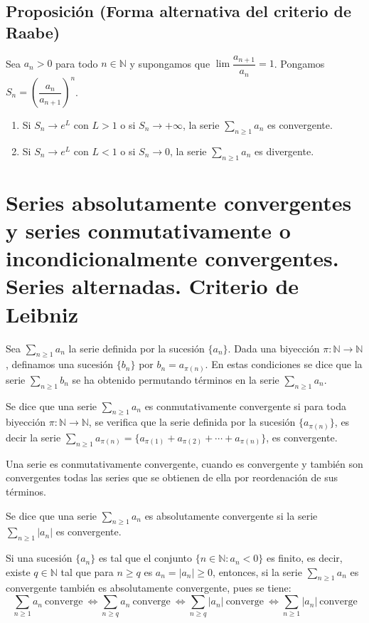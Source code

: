\documentclass[10pt,a4paper]{article}
\begin{document}
	\subsection{Proposición (Forma alternativa del criterio de Raabe)}
	
	Sea $a_n > 0$ para todo $n \in \mathbb{N}$ y supongamos que $\lim\dfrac{a_{n+1}}{a_n} = 1$. Pongamos $S_n = \left(\dfrac{a_n}{a_{n+1}}\right)^n$.
	\begin{enumerate}[label = \roman*)]
		\item Si $S_n \rightarrow e^L$ con $L > 1$ o si $S_n \rightarrow + \infty$, la serie $\displaystyle \sum_{n \geq 1}a_n$ es convergente.
		\item Si $S_n \rightarrow e^L$ con $L < 1$ o si $S_n \rightarrow 0$, la serie $\displaystyle \sum_{n \geq 1}a_n$ es divergente.
	\end{enumerate}


	\newpage
	
	\section{Series absolutamente convergentes y series conmutativamente o incondicionalmente convergentes. Series alternadas. Criterio de Leibniz}
	
	Sea $\displaystyle \sum_{n \geq 1}a_n$ la serie definida por la sucesión $\{a_n\}$. Dada una biyección $\pi : \mathbb{N} \rightarrow \mathbb{N}$, definamos una sucesión $\{b_n\}$ por $b_n = a_{\pi(n)}$. En estas condiciones se dice que la serie $\displaystyle \sum_{n \geq 1}b_n$ se ha obtenido permutando términos en la serie $\displaystyle \sum_{n \geq 1}a_n$.
	
	Se dice que una serie $\displaystyle \sum_{n \geq 1}a_n$ es conmutativamente convergente si para toda biyección $\pi : \mathbb{N} \rightarrow \mathbb{N}$, se verifica que la serie definida por la sucesión $\{a_{\pi(n)}\}$, es decir la serie $\displaystyle \sum_{n \geq 1}a_{\pi(n)} = \{a_{\pi(1)} + a_{\pi(2)} + \cdots + a_{\pi(n)}\}$, es convergente.
	
	Una serie es conmutativamente convergente, cuando es convergente y también son convergentes todas las series que se obtienen de ella por reordenación de sus términos.
	
	Se dice que una serie $\displaystyle \sum_{n \geq 1}a_n$ es absolutamente convergente si la serie $\displaystyle \sum_{n \geq 1}|a_n|$ es convergente.
	
	Si una sucesión $\{a_n\}$ es tal que el conjunto  $\{n \in \mathbb{N}: a_n < 0\}$ es finito, es decir, existe $q \in \mathbb{N}$ tal que para $n \geq q$ es $a_n = |a_n| \geq 0$, entonces, si la serie $\displaystyle \sum_{n \geq 1}a_n$ es convergente también es absolutamente convergente, pues se tiene:
	$$ \displaystyle \sum_{n \geq 1}a_n  ~ \text{converge} ~ \Leftrightarrow \displaystyle \sum_{n \geq q}a_n ~ \text{converge} ~ \Leftrightarrow \displaystyle \sum_{n \geq q}|a_n| ~ \text{converge} ~ \Leftrightarrow \displaystyle \sum_{n \geq 1}|a_n| ~ \text{converge}$$
	
\end{document}
